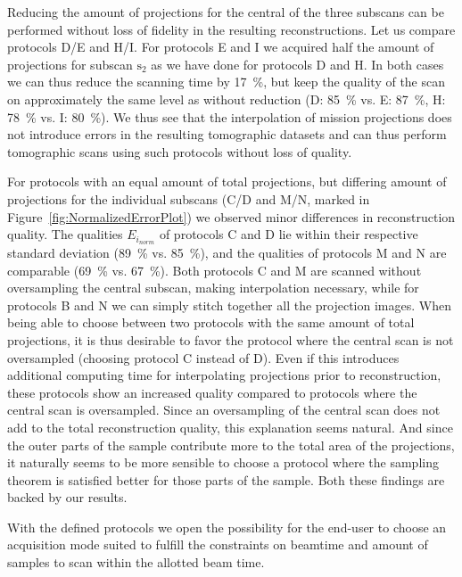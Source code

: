 Reducing the amount of projections for the central of the three subscans can be performed without loss of fidelity in the resulting reconstructions. Let us compare protocols D/E and H/I. For protocols E and I we acquired half the amount of projections for subscan $\textrm{s}_{2}$ as we have done for protocols D and H. In both cases we can thus reduce the scanning time by \SI{17}{\percent}, but keep the quality of the scan on approximately the same level as without reduction (D: \SI{85}{\percent} vs. E: \SI{87}{\percent}, H: \SI{78}{\percent} vs. I: \SI{80}{\percent}).
We thus see that the interpolation of mission projections does not introduce errors in the resulting tomographic datasets and can thus perform tomographic scans using such protocols without loss of quality.

For protocols with an equal amount of total projections, but differing amount of projections for the individual subscans (C/D and M/N, marked in Figure~\ref{fig:NormalizedErrorPlot}) we observed minor differences in reconstruction quality. The qualities $E_{i_{norm}}$ of protocols C and D lie within their respective standard deviation (\SI{89}{\percent} vs. \SI{85}{\percent}), and the qualities of protocols M and N are comparable (\SI{69}{\percent} vs. \SI{67}{\percent}). Both protocols C and M are scanned without oversampling the central subscan, making interpolation necessary, while for protocols B and N we can simply stitch together all the projection images. When being able to choose between two protocols with the same amount of total projections, it is thus desirable to favor the protocol where the central scan is not oversampled (\ie choosing protocol C instead of D). Even if this introduces additional computing time for interpolating projections prior to reconstruction, these protocols show an increased quality compared to protocols where the central scan is oversampled. Since an oversampling of the central scan does not add to the total reconstruction quality, this explanation seems natural. And since the outer parts of the sample contribute more to the total area of the projections, it naturally seems to be more sensible to choose a protocol where the sampling theorem is satisfied better for those parts of the sample. Both these findings are backed by our results.

With the defined protocols we open the possibility for the end-user to choose an acquisition mode suited to fulfill the constraints on beamtime and amount of samples to scan within the allotted beam time. 

